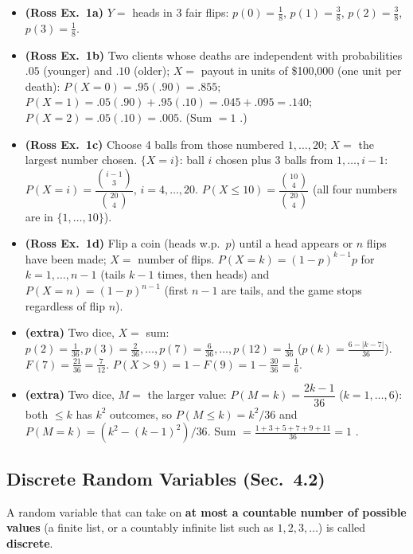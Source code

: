 \documentclass[11pt]{article}
\let\oldsubsection\subsection
\renewcommand{\subsection}{\Needspace{14\baselineskip}\oldsubsection}
\begin{document}
\begin{exbox}[Examples]
\begin{itemize}
\item \textbf{(Ross Ex.\ 1a)} $Y=$ heads in 3 fair flips: $p(0)=\tfrac18$, $p(1)=\tfrac38$, $p(2)=\tfrac38$, $p(3)=\tfrac18$.
\item \textbf{(Ross Ex.\ 1b)} Two clients whose deaths are independent with probabilities $.05$ (younger) and $.10$ (older); $X=$ payout in units of \$100{,}000 (one unit per death): $P(X=0)=.95(.90)=.855$; $P(X=1)=.05(.90)+.95(.10)=.045+.095=.140$; $P(X=2)=.05(.10)=.005$. (Sum $=1$ \checkmark.)
\item \textbf{(Ross Ex.\ 1c)} Choose 4 balls from those numbered $1,\dots,20$; $X=$ the largest number chosen. $\{X=i\}$: ball $i$ chosen plus 3 balls from $1,\dots,i-1$: $P(X=i)=\dfrac{\binom{i-1}3}{\binom{20}4}$, $i=4,\dots,20$. $P(X\le10)=\dfrac{\binom{10}4}{\binom{20}4}$ (all four numbers are in $\{1,\dots,10\}$).
\item \textbf{(Ross Ex.\ 1d)} Flip a coin (heads w.p.\ $p$) until a head appears or $n$ flips have been made; $X=$ number of flips. $P(X=k)=(1-p)^{k-1}p$ for $k=1,\dots,n-1$ (tails $k-1$ times, then heads) and $P(X=n)=(1-p)^{n-1}$ (first $n-1$ are tails, and the game stops regardless of flip $n$).
\item \textbf{(extra)} Two dice, $X=$ sum: $p(2)=\tfrac1{36},p(3)=\tfrac2{36},\dots,p(7)=\tfrac6{36},\dots,p(12)=\tfrac1{36}$ ($p(k)=\frac{6-|k-7|}{36}$). $F(7)=\tfrac{21}{36}=\tfrac7{12}$. $P(X>9)=1-F(9)=1-\tfrac{30}{36}=\tfrac16$.
\item \textbf{(extra)} Two dice, $M=$ the larger value: $P(M=k)=\dfrac{2k-1}{36}$ ($k=1,\dots,6$): both $\le k$ has $k^2$ outcomes, so $P(M\le k)=k^2/36$ and $P(M=k)=(k^2-(k-1)^2)/36$. Sum $=\frac{1+3+5+7+9+11}{36}=1$ \checkmark.
\end{itemize}
\end{exbox}

\subsection{Discrete Random Variables (Sec.\ 4.2)}

\begin{defbox}
A random variable that can take on \textbf{at most a countable number of possible values} (a finite list, or a countably infinite list such as $1,2,3,\dots$) is called \textbf{discrete}.
\end{defbox}
\end{document}

